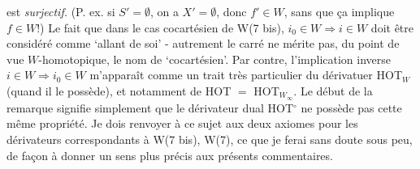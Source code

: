 
est \textit{surjectif.} (P. ex. si $S'=\emptyset$, on a $X'=\emptyset$, donc $f'\in W$, sans que ça implique $f\in W$!) Le fait que dans le cas cocartésien de W(7 bis), $i_0\in W\Longrightarrow i\in W$ doit être considéré comme ‘allant de soi’ - autrement le carré ne mérite pas, du point de vue $W$-homotopique, le nom de ‘cocartésien’. Par contre, l’implication inverse $i\in W\Longrightarrow i_0\in W$ m’apparaît comme un trait très particulier du dérivatuer HOT$_W$ (quand il le possède), et notamment %
de HOT $=$ HOT$_{W_\infty}$. Le début
de la remarque signifie simplement que le dérivateur dual HOT$^\circ$ ne possède pas cette même propriété. Je dois renvoyer à ce sujet aux deux axiomes pour les dérivateurs correspondants à W(7 bis), W(7), ce que je ferai sans doute sous peu, de façon à donner un sens plus précis aux présents commentaires.

